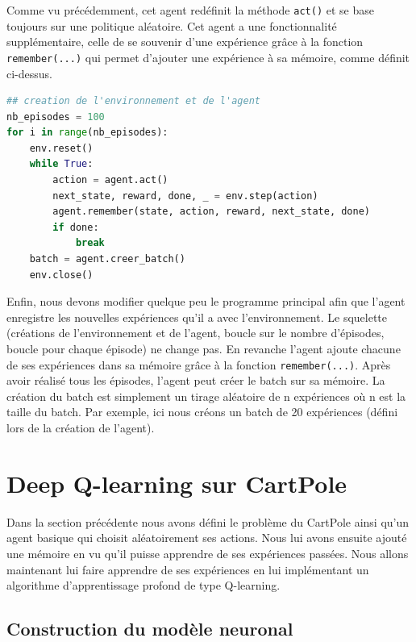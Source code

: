 \documentclass[10pt,a4paper]{article}
\begin{document}
Comme vu précédemment, cet agent redéfinit la méthode \lstinline{act()} et se base toujours sur une politique aléatoire. Cet agent a une fonctionnalité supplémentaire, celle de se souvenir d'une expérience grâce à la fonction \lstinline{remember(...)} qui permet d'ajouter une expérience à sa mémoire, comme définit ci-dessus.

\begin{lstlisting}[language=Python, caption=Programme principal de l'agent utilisant l'expérience replay]
## creation de l'environnement et de l'agent
nb_episodes = 100
for i in range(nb_episodes):
    env.reset()
    while True:
        action = agent.act()
        next_state, reward, done, _ = env.step(action)
        agent.remember(state, action, reward, next_state, done)
        if done:
            break
    batch = agent.creer_batch()
    env.close()
\end{lstlisting}

Enfin, nous devons modifier quelque peu le programme principal afin que l'agent enregistre les nouvelles expériences qu'il a avec l'environnement. Le squelette (créations de l'environnement et de l'agent, boucle sur le nombre d'épisodes, boucle pour chaque épisode) ne change pas. En revanche l'agent ajoute chacune de ses expériences dans sa mémoire grâce à la fonction \lstinline{remember(...)}. Après avoir réalisé tous les épisodes, l'agent peut créer le batch sur sa mémoire. La création du batch est simplement un tirage aléatoire de n expériences où n est la taille du batch. Par exemple, ici nous créons un batch de 20 expériences (défini lors de la création de l'agent).



\section{Deep Q-learning sur CartPole}

Dans la section précédente nous avons défini le problème du CartPole ainsi qu'un agent basique qui choisit aléatoirement ses actions. Nous lui avons ensuite ajouté  une mémoire en vu qu'il puisse apprendre de ses expériences passées. Nous allons maintenant lui faire apprendre de ses expériences en lui implémentant un algorithme d'apprentissage profond de type Q-learning.

\subsection{Construction du modèle neuronal}
\end{document}
